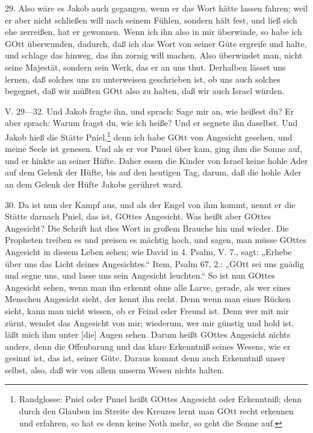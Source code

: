 29. Also wäre es Jakob auch gegangen, wenn er das Wort hätte lassen fahren; weil er aber nicht schließen will nach seinem Fühlen, sondern hält fest, und ließ sich ehe zerreißen, hat er gewonnen. Wenn ich ihn also in mir überwinde, so habe ich GOtt überwunden, dadurch, daß ich das Wort von seiner Güte ergreife und halte, und schlage das hinweg, das ihn zornig will machen. Also überwindet man, nicht seine Majestät, sondern sein Werk, das er an uns thut. Derhalben lässet uns lernen, daß solches uns zu unterweisen geschrieben ist, ob uns auch solches begegnet, daß wir müßten GOtt also zu halten, daß wir auch Israel würden.

V. 29—32. Und Jakob fragte ihn, und sprach: Sage mir an, wie heißest du? Er aber sprach: Warum fragst du, wie ich heiße? Und er segnete ihn daselbst. Und Jakob hieß die Stätte Pniel,\footnote{Randglosse: Pniel oder Pnuel heißt GOttes Angesicht oder Erkenntniß; denn durch den Glauben im Streite des Kreuzes lernt man GOtt recht erkennen und erfahren, so hat es denn keine Noth mehr, so geht die Sonne auf.} denn ich habe GOtt von Angesicht gesehen, und meine Seele ist genesen. Und als er vor Pnuel über kam, ging ihm die Sonne auf, und er hinkte an seiner Hüfte. Daher essen die Kinder von Israel keine hohle Ader auf dem Gelenk der Hüfte, bis auf den heutigen Tag, darum, daß die hohle Ader an dem Gelenk der Hüfte Jakobs gerühret ward.


30. Da ist nun der Kampf aus, und als der Engel von ihm kommt, nennt er die Stätte darnach Pniel, das ist, GOttes Angesicht. Was heißt aber GOttes Angesicht? Die Schrift hat dies Wort in großem Brauche hin und wieder. Die Propheten treiben es und preisen es mächtig hoch, und sagen, man müsse GOttes Angesicht in diesem Leben sehen; wie David in 4. Psalm, V. 7., sagt: „Erhebe über uns das Licht deines Angesichtes.“ Item, Psalm 67, 2.: „GOtt sei uns gnädig und segne uns, und lasse uns sein Angesicht leuchten.“ So ist nun GOttes Angesicht sehen, wenn man ihn erkennt ohne alle Larve, gerade, als wer eines Menschen Angesicht sieht, der kennt ihn recht. Denn wenn man eines Rücken sieht, kann man nicht wissen, ob er Feind oder Freund ist. Denn wer mit mir zürnt, wendet das Angesicht von mir; wiederum, wer mir günstig und hold ist, läßt mich ihm unter [die] Augen sehen. Darum heißt GOttes Angesicht nichts anders, denn die Offenbarung und das klare Erkenntniß seines Wesens, wie er gesinnt ist, das ist, seiner Güte. Daraus kommt denn auch Erkenntniß unser selbst, also, daß wir von allem unserm Wesen nichts halten.

